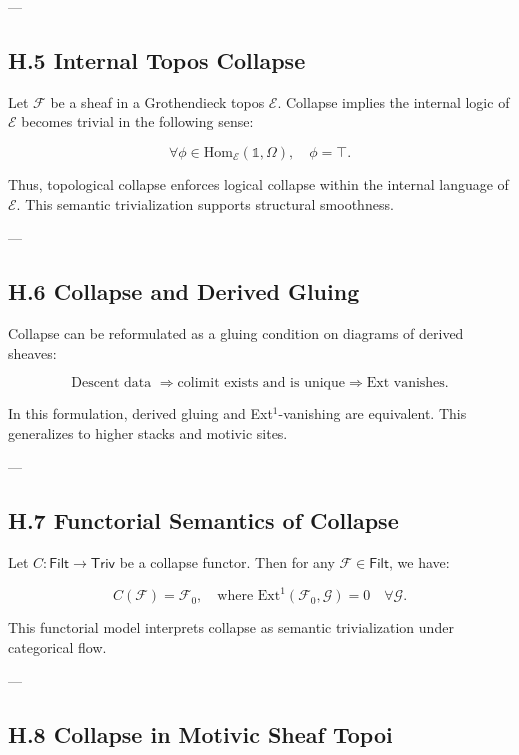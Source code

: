\documentclass[11pt]{article}
\begin{document}
---

\subsection*{H.5 Internal Topos Collapse}

Let $\mathcal{F}$ be a sheaf in a Grothendieck topos $\mathcal{E}$.  
Collapse implies the internal logic of $\mathcal{E}$ becomes trivial in the following sense:

\[
\forall \phi \in \mathrm{Hom}_\mathcal{E}(\mathbb{1}, \Omega), \quad \phi = \top.
\]

Thus, topological collapse enforces logical collapse within the internal language of $\mathcal{E}$.  
This semantic trivialization supports structural smoothness.

---

\subsection*{H.6 Collapse and Derived Gluing}

Collapse can be reformulated as a gluing condition on diagrams of derived sheaves:

\[
\text{Descent data } \Rightarrow \text{colimit exists and is unique} \Rightarrow \text{Ext vanishes}.
\]

In this formulation, derived gluing and Ext$^1$-vanishing are equivalent.  
This generalizes to higher stacks and motivic sites.

---

\subsection*{H.7 Functorial Semantics of Collapse}

Let $C: \mathsf{Filt} \to \mathsf{Triv}$ be a collapse functor.  
Then for any $\mathcal{F} \in \mathsf{Filt}$, we have:

\[
C(\mathcal{F}) = \mathcal{F}_0, \quad \text{where } \mathrm{Ext}^1(\mathcal{F}_0, \mathcal{G}) = 0 \quad \forall \mathcal{G}.
\]

This functorial model interprets collapse as semantic trivialization under categorical flow.

---

\subsection*{H.8 Collapse in Motivic Sheaf Topoi}
\end{document}
